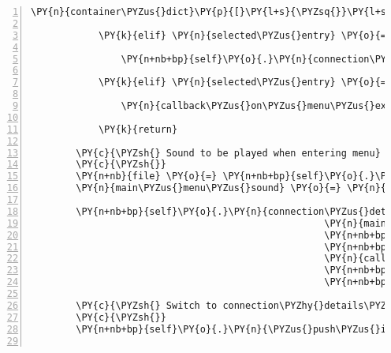 \begin{Verbatim}[commandchars=\\\{\},numbers=left,firstnumber=1,stepnumber=1]
                \PY{n}{container\PYZus{}dict}\PY{p}{[}\PY{l+s}{\PYZsq{}}\PY{l+s}{connector}\PY{l+s}{\PYZsq{}}\PY{p}{]} \PY{o}{=} \PY{n}{audio\PYZus{}text\PYZus{}field\PYZus{}ip\PYZus{}address}\PY{o}{.}\PY{n}{process\PYZus{}key\PYZus{}input}\PY{p}{(}\PY{p}{)}

            \PY{k}{elif} \PY{n}{selected\PYZus{}entry} \PY{o}{==} \PY{l+s}{\PYZdq{}}\PY{l+s}{Start game}\PY{l+s}{\PYZdq{}}\PY{p}{:}

                \PY{n+nb+bp}{self}\PY{o}{.}\PY{n}{connection\PYZus{}details\PYZus{}complete} \PY{o}{=} \PY{n+nb+bp}{True}

            \PY{k}{elif} \PY{n}{selected\PYZus{}entry} \PY{o}{==} \PY{l+s}{\PYZdq{}}\PY{l+s}{Exit}\PY{l+s}{\PYZdq{}}\PY{p}{:}

                \PY{n}{callback\PYZus{}on\PYZus{}menu\PYZus{}exit}\PY{p}{(}\PY{n}{connection\PYZus{}details\PYZus{}menu}\PY{p}{)}

            \PY{k}{return}

        \PY{c}{\PYZsh{} Sound to be played when entering menu}
        \PY{c}{\PYZsh{}}
        \PY{n+nb}{file} \PY{o}{=} \PY{n+nb+bp}{self}\PY{o}{.}\PY{n}{assets}\PY{o}{.}\PY{n}{fetch}\PY{p}{(}\PY{l+s}{\PYZsq{}}\PY{l+s}{fabula\PYZus{}main\PYZus{}menu.ogg}\PY{l+s}{\PYZsq{}}\PY{p}{)}
        \PY{n}{main\PYZus{}menu\PYZus{}sound} \PY{o}{=} \PY{n}{pygame}\PY{o}{.}\PY{n}{mixer}\PY{o}{.}\PY{n}{Sound}\PY{p}{(}\PY{n+nb}{file}\PY{p}{)}

        \PY{n+nb+bp}{self}\PY{o}{.}\PY{n}{connection\PYZus{}details\PYZus{}menu} \PY{o}{=} \PY{n}{TextMenuList}\PY{p}{(}\PY{n}{connection\PYZus{}details\PYZus{}entries}\PY{p}{,}
                                                    \PY{n}{main\PYZus{}menu\PYZus{}sound}\PY{p}{,}
                                                    \PY{n+nb+bp}{None}\PY{p}{,}
                                                    \PY{n+nb+bp}{self}\PY{o}{.}\PY{n}{channel\PYZus{}system}\PY{p}{,}
                                                    \PY{n}{callback\PYZus{}on\PYZus{}entry\PYZus{}selected}\PY{p}{,}
                                                    \PY{n+nb+bp}{None}\PY{p}{,}
                                                    \PY{n+nb+bp}{self}\PY{o}{.}\PY{n}{tts\PYZus{}engine}\PY{p}{)}

        \PY{c}{\PYZsh{} Switch to connection\PYZhy{}details\PYZhy{}input\PYZhy{}state}
        \PY{c}{\PYZsh{}}
        \PY{n+nb+bp}{self}\PY{o}{.}\PY{n}{\PYZus{}push\PYZus{}input\PYZus{}state\PYZus{}on\PYZus{}stack}\PY{p}{(}\PY{n+nb+bp}{self}\PY{o}{.}\PY{n}{INPUT\PYZus{}STATE\PYZus{}CONNECTION\PYZus{}DETAILS}\PY{p}{)}


\end{Verbatim}
